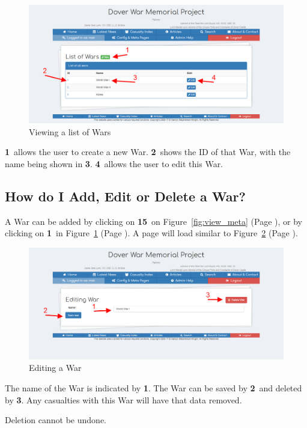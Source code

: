 \documentclass[12pt]{article}
\newcommand{\marker}[1]{\color{red}\textbf{#1}\color{black}}
\newcommand{\myref}[1]{\ref{#1} {\scriptsize(Page \pageref{#1})}}
\begin{document}
\begin{figure}[h]
  \centering
 \includegraphics[width=.9\textwidth]{pics/view_war.png}
	\caption{Viewing a list of Wars}\label{fig:view_war}
\end{figure}

\marker{1}\ allows the user to create a new War. \marker{2}\ shows the ID of that War, with the name being shown in \marker{3}. \marker{4}\ allows the user to edit this War.

\newpage
\FloatBarrier
\subsection{How do I Add, Edit or Delete a War?} \label{ssec:edit_war}
A War can be added by clicking on \marker{15}\ on Figure~\myref{fig:view_meta}, or by clicking on \marker{1}\ in Figure~\myref{fig:view_war}. A page will load similar to Figure~\myref{fig:edit_war}.

\begin{figure}[h]
  \centering
 \includegraphics[width=.9\textwidth]{pics/edit_war.png}
	\caption{Editing a War}\label{fig:edit_war}
\end{figure}

The name of the War is indicated by \marker{1}. The War can be saved by \marker{2}\ and deleted by \marker{3}. Any casualties with this War will have that data removed.

\begin{warningBox}
Deletion cannot be undone.
\end{warningBox} 
\end{document}
